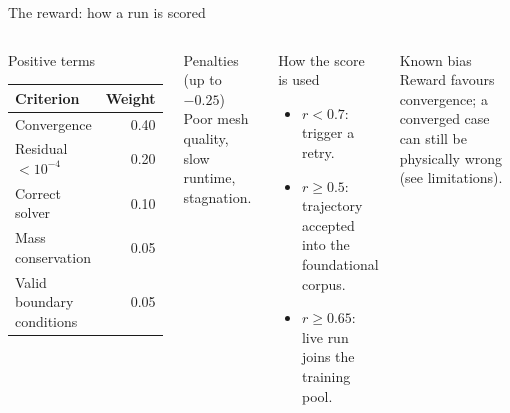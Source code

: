 \documentclass[aspectratio=169,10pt]{beamer}
\begin{document}
\begin{frame}{The reward: how a run is scored}
\begin{columns}[T,onlytextwidth]
\begin{block}{Positive terms}
\small
\renewcommand{\arraystretch}{1.15}
\begin{tabular}{@{}lr@{}}
\toprule
Criterion & Weight \\
\midrule
Convergence & 0.40 \\
Residual $<10^{-4}$ & 0.20 \\
Correct solver & 0.10 \\
Mass conservation & 0.05 \\
Valid boundary conditions & 0.05 \\
\bottomrule
\end{tabular}
\end{block}
\begin{alertblock}{Penalties (up to $-0.25$)}
\small Poor mesh quality, slow runtime, stagnation.
\end{alertblock}
\begin{exampleblock}{How the score is used}
\small
\begin{itemize}
  \item $r<0.7$: trigger a retry.
  \item $r\ge0.5$: trajectory accepted into the foundational corpus.
  \item $r\ge0.65$: live run joins the training pool.
\end{itemize}
\end{exampleblock}
\begin{alertblock}{Known bias}
\small Reward favours convergence; a converged case can still be physically wrong (see limitations).
\end{alertblock}
\end{columns}
\end{frame}
\end{document}
